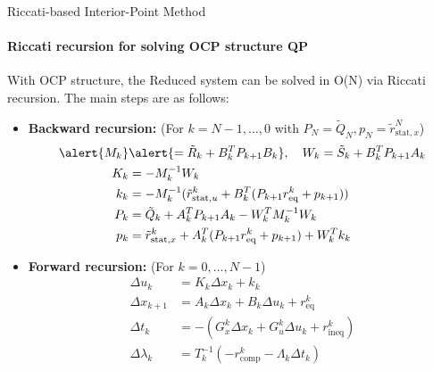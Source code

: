 \documentclass[10pt,aspectratio=1610]{beamer} %
\begin{document}
\begin{frame}{Riccati-based Interior-Point Method}
    \framesubtitle{Riccati recursion for solving OCP structure QP}
    With OCP structure, the Reduced system can be solved in O(N) via Riccati recursion. The main steps are as follows:
    \pause
	\begin{itemize}
        \item \textbf{Backward recursion:} (For $k = N-1, \dots, 0$ with $P_N = \tilde{Q}_N, p_N = \tilde{r}_{\mathrm{stat}, x}^N$)
        \begin{equation*}
            \begin{aligned}
                \alert{M_k} & \alert{= \tilde{R}_k + B_k^T P_{k+1} B_k}, \quad W_k = \tilde{S}_k + B_k^T P_{k+1} A_k \\
                K_k &= -M_k^{-1} W_k \\
				\quad k_k &= -M_k^{-1} (\tilde{r}_{\mathrm{stat}, u}^k + B_k^T (P_{k+1} r_{\mathrm{eq}}^k + p_{k+1})) \\
                P_k &= \tilde{Q}_k + A_k^T P_{k+1} A_k - W_k^T M_k^{-1} W_k \\
                p_k &= \tilde{r}_{\mathrm{stat}, x}^k + A_k^T (P_{k+1} r_{\mathrm{eq}}^k + p_{k+1}) + W_k^T k_k
            \end{aligned}
	\end{equation*}
    \pause
		\item \textbf{Forward recursion:} (For $k = 0, \dots, N-1$)
        \begin{equation*}
            \begin{aligned}
                \Delta u_k &= K_k \Delta x_k + k_k \\
                \Delta x_{k+1} &= A_k \Delta x_k + B_k \Delta u_k + r_{\mathrm{eq}}^k \\
				\Delta t_k &= -(G_{x}^k \Delta x_k + G_{u}^k \Delta u_k + r_{\mathrm{ineq}}^k) \\
				\Delta \lambda_k &= T_k^{-1} (-r_{\mathrm{comp}}^k - \Lambda_k \Delta t_k)
            \end{aligned}
        \end{equation*}
	\end{itemize}
\end{frame}
\end{document}
